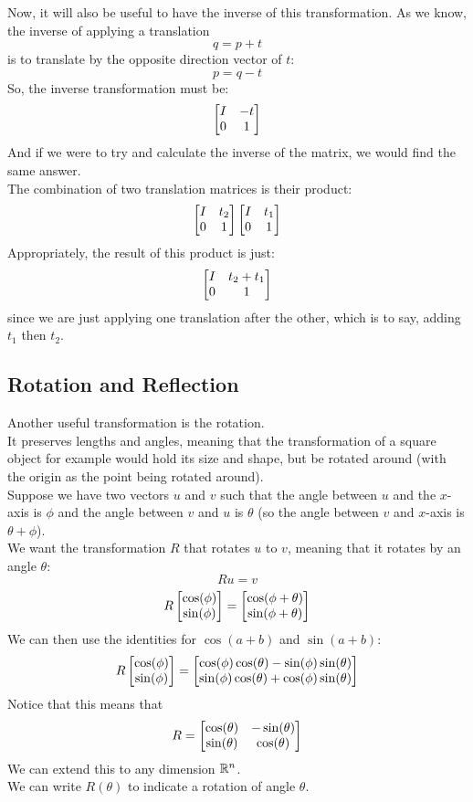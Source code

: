 \documentclass[12pt]{article}
\begin{document}
Now, it will also be useful to have the inverse of this
transformation.
As we know, the inverse of applying a translation
\[ q = p + t \]
is to translate by the opposite direction vector of $t$:
\[ p = q - t \]
So, the inverse transformation must be:
\[ \begin{bmatrix} {I} & {-t} \\{ 0} & {1} \end{bmatrix} \]
And if we were to try and calculate the inverse of the
matrix, we would find the same answer. \\

The combination of two translation matrices
is their product:
\[ \begin{bmatrix} {I} & {t_2} \\ {0} & {1} \end{bmatrix} 
\begin{bmatrix} {I} & {t_1} \\ {0} & {1} \end{bmatrix} \]
Appropriately, the result of this product is
just:
\[ \begin{bmatrix} {I} & {t_2 + t_1} \\{0} & {1} \end{bmatrix} \]
since we are just applying one translation
after the other,
which is to say, adding $t_1$ then $t_2$. \\

\newpage

\subsection*{Rotation and Reflection}

Another useful transformation is the rotation. \\
It preserves lengths and angles,
meaning that the transformation of a square object
for example would hold its size and shape, but be rotated
around (with the origin as the point being rotated around). \\

Suppose we have two vectors $u$ and $v$
such that the angle between $u$ and the $x$-axis
is $\phi$ and the angle between $v$ and $u$
is $\theta$ (so the angle between $v$
and $x$-axis is $\theta + \phi$). \\
We want the transformation $R$
that rotates $u$ to $v$,
meaning that it rotates by an angle $\theta$:
\[ Ru = v \]
\[ R \begin{bmatrix} {\cos(\phi)} \\{\sin(\phi)} \end{bmatrix}
= \begin{bmatrix} {\cos(\phi + \theta)} \\ {\sin(\phi + \theta)} \end{bmatrix} \]
We can then use the identities for
$\cos(a + b)$ and $\sin(a+b)$:
\[ R \begin{bmatrix} {\cos(\phi)} \\ {\sin(\phi)} \end{bmatrix}
= \begin{bmatrix} {\cos(\phi)\cos(\theta) - 
\sin(\phi)\sin(\theta)} \\
{\sin(\phi)\cos(\theta) + 
\cos(\phi)\sin(\theta)} \end{bmatrix} \]
Notice that this means that
\[R = \begin{bmatrix} {\cos(\theta)} & {-\sin(\theta)} \\
{\sin(\theta)} & {\cos(\theta)} \end{bmatrix} \]
We can extend this to any dimension $\mathbb{R}^n$. \\
We can write $R(\theta)$ to indicate
a rotation of angle $\theta$. \\
\end{document}
